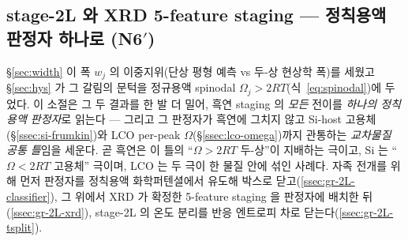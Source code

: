 \subsection{stage-2L 와 XRD 5-feature staging --- 정칙용액 판정자 하나로 (N6$'$)}\label{ssec:gr-2L}
\S\ref{sec:width} 이 폭 $w_j$ 의 이중지위(단상 평형 예측 vs 두-상 현상학 폭)를 세웠고 \S\ref{sec:hys} 가 그
갈림의 문턱을 정규용액 spinodal $\Omega_j>2RT$(식~\eqref{eq:spinodal})에 두었다. 이 소절은 그 두 결과를 한
발 더 밀어, 흑연 staging 의 \emph{모든} 전이를 \emph{하나의 정칙용액 판정자}로 읽는다 --- 그리고 그 판정자가
흑연에 그치지 않고 Si-host 고용체(\S\ref{ssec:si-frumkin})와 LCO per-peak $\Omega$(\S\ref{ssec:lco-omega})까지
관통하는 \emph{교차물질 공통 틀}임을 세운다. 곧 흑연은 이 틀의 ``$\Omega>2RT$ 두-상''이 지배하는 극이고,
Si 는 ``$\Omega<2RT$ 고용체'' 극이며, LCO 는 두 극이 한 물질 안에 섞인 사례다. 자족 전개를 위해 먼저
판정자를 정칙용액 화학퍼텐셜에서 유도해 박스로 닫고(\ref{ssec:gr-2L-classifier}), 그 위에서 XRD 가 확정한
5-feature staging 을 판정자에 배치한 뒤(\ref{ssec:gr-2L-xrd}), stage-2L 의 온도 분리를 반응 엔트로피 차로
닫는다(\ref{ssec:gr-2L-tsplit}).

